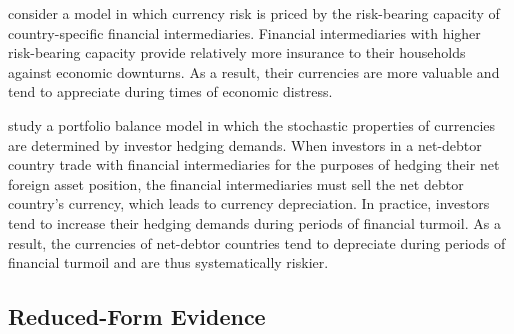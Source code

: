 \documentclass[11pt]{article}
\begin{document}
\citet{MalamudSchrimpf2020} consider a model in which currency risk is priced by the risk-bearing capacity of country-specific financial intermediaries. Financial intermediaries with higher risk-bearing capacity provide relatively more insurance to their households against economic downturns. As a result, their currencies are more valuable and tend to appreciate during times of economic distress.

\citet{LiaoZhang2020} study a portfolio balance model in which the stochastic properties of currencies are determined by investor hedging demands. When investors in a net-debtor country trade with financial intermediaries for the purposes of hedging their net foreign asset position, the financial intermediaries must sell the net debtor country's currency, which leads to currency depreciation. In practice, investors tend to increase their hedging demands during periods of financial turmoil. As a result, the currencies of net-debtor countries tend to depreciate during periods of financial turmoil and are thus systematically riskier.
 
 



\subsection{Reduced-Form Evidence}
\end{document}
